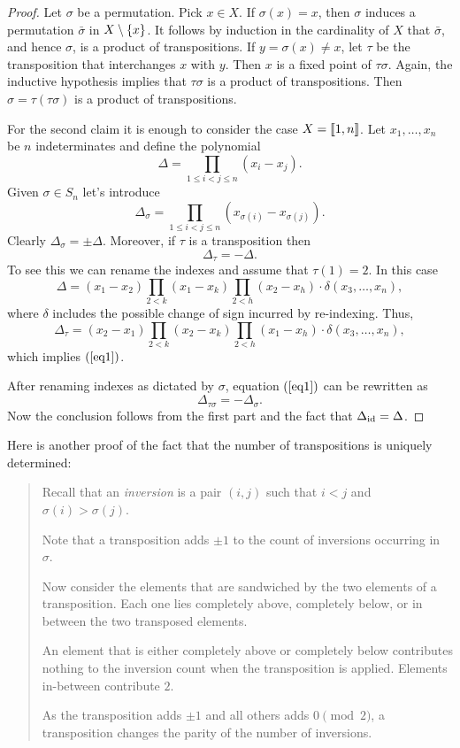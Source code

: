 \begin{proof} Let $\sigma$ be a permutation. Pick $x\in X$. If $\sigma(x)=x$, then $\sigma$ induces a permutation $\bar\sigma$ in $X\setminus\{x\}$. It follows by induction in the cardinality of $X$ that $\bar\sigma$, and hence $\sigma$, is a product of transpositions. If $y=\sigma(x)\ne x$, let $\tau$ be the transposition that interchanges $x$ with $y$. Then $x$ is a fixed point of $\tau\sigma$. Again, the inductive hypothesis implies that $\tau\sigma$ is a product of transpositions. Then $\sigma=\tau(\tau\sigma)$ is a product of transpositions.

For the second claim it is enough to consider the case $X=\llbracket1,n\rrbracket$. Let $x_1,
\dots,x_n$ be $n$ indeterminates and define the polynomial
$$
    \Delta = \prod_{1\le i<j\le n}(x_i-x_j).
$$
Given $\sigma\in S_n$ let's introduce
$$
    \Delta_\sigma = \prod_{1\le i<j\le n}(x_{\sigma(i)}-x_{\sigma(j)}).
$$
Clearly $\Delta_\sigma = \pm\Delta$. Moreover, if $\tau$ is a transposition then
\begin{equation}\label{eq1}
    \Delta_\tau = -\Delta.
\end{equation}
To see this we can rename the indexes and assume that $\tau(1)=2$. In this case
$$
    \Delta = (x_1-x_2)\prod_{2<k}(x_1-x_k)\prod_{2<h}(x_2-x_h)
        \cdot\delta(x_3,\dots,x_n),
$$
where $\delta$ includes the possible change of sign incurred by re-indexing. Thus,
$$
    \Delta_\tau = (x_2-x_1)\prod_{2<k}(x_2-x_k)\prod_{2<h}(x_1-x_h)
        \cdot\delta(x_3,\dots,x_n),
$$
which implies $(\ref{eq1})$.

After renaming indexes as dictated by $\sigma$, equation $(\ref{eq1})$ can be rewritten as
$$
    \Delta_{\tau\sigma} = - \Delta_\sigma.
$$
Now the conclusion follows from the first part and the fact that $\Delta_{\operatorname{id}}=\Delta$.  \end{proof}

\medskip

\begin{rem}
    Here is another proof of the fact that the number of transpositions is uniquely determined:
    \begin{quote}\small
        Recall that an \textsl{inversion} is a pair $(i,j)$ such that $i<j$ and $\sigma(i)>\sigma(j)$.
    
        Note that a transposition adds $\pm1$ to the count of inversions occurring in~$\sigma$.
        
        Now consider the elements that are sandwiched by the two elements of a transposition. Each one lies completely above, completely below, or in between the two transposed elements.
    
        An element that is either completely above or completely below contributes nothing to the inversion count when the transposition is applied. Elements in-between contribute $2$.
        
        As the transposition adds $\pm1$ and all others adds $0\pmod2$, a transposition changes the parity of the number of inversions.
    \end{quote}
\end{rem}

